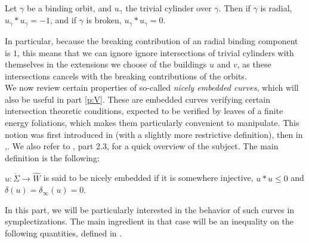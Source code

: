 \documentclass[../main.tex]{subfiles}
\begin{document}
\begin{lemma}
Let $\gamma$ be a binding orbit, and $u_\gamma$ the trivial cylinder over $\gamma$. Then if $\gamma$ is radial, $u_\gamma*u_\gamma = -1$, and if $\gamma$ is broken, $u_\gamma*u_\gamma = 0$.
\end{lemma}

In particular, because the breaking contribution of an radial binding component is $1$, this means that we can ignore ignore intersections of trivial cylinders with themselves in the extensions we choose of the buildings $u$ and $v$, as these intersections cancels with the breaking contributions of the orbits.\\



We now review certain properties of so-called \textit{nicely embedded curves}, which will also be useful in part \ref{p:V}. These are embedded curves verifying certain intersection theoretic conditions, expected to be verified by leaves of a finite energy foliations, which makes them particularly convenient to manipulate. This notion was first introduced in \cite{wendl_automatic_2009} (with a slightly more restrictive definition), then in \cite{wendl_compactness_2008},\cite{cioba_nicely_nodate}. We also refer to \cite{SOBD2}, part 2.3, for a quick overview of the subject. The main definition is the following:
\begin{definition}
$u:\dot\Sigma\rightarrow \widehat{W}$ is said to be nicely embedded if it is somewhere injective, $u*u \leq 0$ and $\delta(u) = \delta_\infty(u) = 0$.
\end{definition}

In this part, we will be particularly interested in the behavior of such curves in symplectizations.
The main ingredient in that case will be an inequality on the following quantities, defined in \cite{hofer_properties_nodate}.
\end{document}
